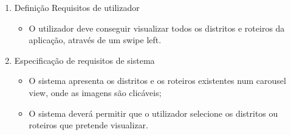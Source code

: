 \begin{enumerate}
    \item Definição Requisitos de utilizador
    \begin{itemize}
        \item O utilizador deve conseguir visualizar todos os distritos e roteiros da aplicação, através de um swipe left.
    \end{itemize}
    \item Especificação de requisitos de sistema
    \begin{itemize}
        \item O sistema apresenta os distritos e os roteiros existentes num carousel view, onde as imagens são clicáveis;
        \item O sistema deverá permitir que o utilizador selecione os distritos ou roteiros que pretende visualizar.
    \end{itemize}
\end{enumerate}